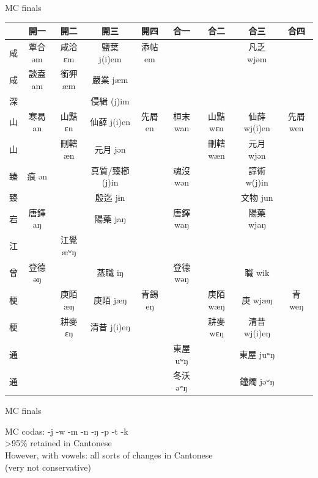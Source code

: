 \documentclass{beamer}
\begin{document}
\begin{frame}[fragile]{MC finals}

\begin{table}
    \centering
      {\scriptsize
        \setlength{\tabcolsep}{1pt}
        \renewcommand{\arraystretch}{1.2}    \begin{tabular}{c|c c c c|c c c c}
         & 開一 & 開二 & 開三 & 開四 & 合一 & 合二 & 合三 & 合四 \\ \hline
        咸 & 覃合 əm & 咸洽 ɛm & 鹽葉 j(i)em & 添帖 em & & & 凡乏 wjəm & \\
        咸 & 談盍 am & 銜狎 æm & 嚴業 jæm & & & & & \\ \hline 
        深 & & & 侵緝 (j)im & & & & & \\ \hline
        山 & 寒曷 an & 山黠 ɛn & 仙薛 j(i)en & 先屑 en & 桓末 wan & 山黠 wɛn & 仙薛 wj(i)en & 先屑 wen \\
        山 & & 刪轄 æn & 元月 jən & & & 刪轄 wæn & 元月 wjən & \\ \hline
        臻 & 痕 ən & & 真質/臻櫛 (j)in & & 魂沒 wən & & 諄術 w(j)in & \\
        臻 & & & 殷迄 jɨn & & & & 文物 jun & \\ \hline
        宕 & 唐鐸 aŋ & & 陽藥 jaŋ & & 唐鐸 waŋ & & 陽藥 wjaŋ & \\ \hline
        江 & & 江覺 æʷŋ & & & & & & \\ \hline
        曾 & 登德 əŋ & & 蒸職 iŋ & & 登德 wəŋ & & 職 wik & \\ \hline
        梗 & & 庚陌 æŋ & 庚陌 jæŋ & 青錫 eŋ & & 庚陌 wæŋ & 庚 wjæŋ & 青 weŋ \\
        梗 & & 耕麥 ɛŋ & 清昔 j(i)eŋ & & & 耕麥 wɛŋ & 清昔 wj(i)eŋ & \\ \hline
        通 & & & & & 東屋 uʷŋ & & 東屋 juʷŋ & \\
        通 & & & & & 冬沃 əʷŋ & & 鐘燭 jəʷŋ & \\
    \end{tabular}}
\end{table}

\end{frame}

\begin{frame}[fragile]{MC finals}

MC codas: -j -w -m -n -ŋ -p -t -k \\
>95\% retained in Cantonese\\
\medskip
However, with vowels: all sorts of changes in Cantonese\\
{\footnotesize (very not conservative)}\\

\end{frame}
\end{document}
